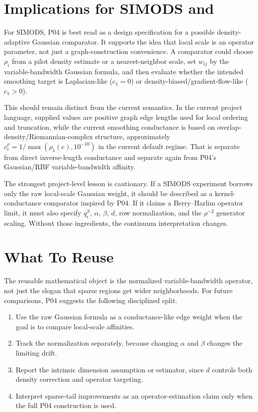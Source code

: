 \documentclass[11pt]{article}
\begin{document}
\section{Implications for SIMODS and }

For SIMODS, P04 is best read as a design specification for a possible
density-adaptive Gaussian comparator.  It supports the idea that local scale is
an operator parameter, not just a graph-construction convenience.  A comparator
could choose \(\rho_i\) from a pilot density estimate or a nearest-neighbor
scale, set \(w_{ij}\) by the variable-bandwidth Gaussian formula, and then
evaluate whether the intended smoothing target is Laplacian-like
(\(c_1=0\)) or density-biased/gradient-flow-like (\(c_1>0\)).

This should remain distinct from the current 
semantics.  In the current project language, supplied  values
are positive graph edge lengths used for local ordering and truncation, while
the current smoothing conductance is based on overlap-density/Riemannian-complex
structure, approximately \(c_e^\rho=1/\max(\rho_1(e),10^{-10})\) in the current
default regime.  That is separate from direct inverse-length conductance and
separate again from P04's Gaussian/RBF variable-bandwidth affinity.

The strongest project-level lesson is cautionary.  If a SIMODS experiment
borrows only the raw local-scale Gaussian weight, it should be described as a
kernel-conductance comparator inspired by P04.  If it claims a Berry--Harlim
operator limit, it must also specify \(q_\epsilon^S\), \(\alpha\), \(\beta\),
\(d\), row normalization, and the \(\rho^{-2}\) generator scaling.  Without
those ingredients, the continuum interpretation changes.

\section{What To Reuse}

The reusable mathematical object is the normalized variable-bandwidth operator,
not just the slogan that sparse regions get wider neighborhoods.  For future
comparisons, P04 suggests the following disciplined split.

\begin{enumerate}
\item Use the raw Gaussian formula as a conductance-like edge weight when the
goal is to compare local-scale affinities.
\item Track the normalization separately, because changing \(\alpha\) and
\(\beta\) changes the limiting drift.
\item Report the intrinsic dimension assumption or estimator, since \(d\)
controls both density correction and operator targeting.
\item Interpret sparse-tail improvements as an operator-estimation claim only
when the full P04 construction is used.
\end{enumerate}
\end{document}
